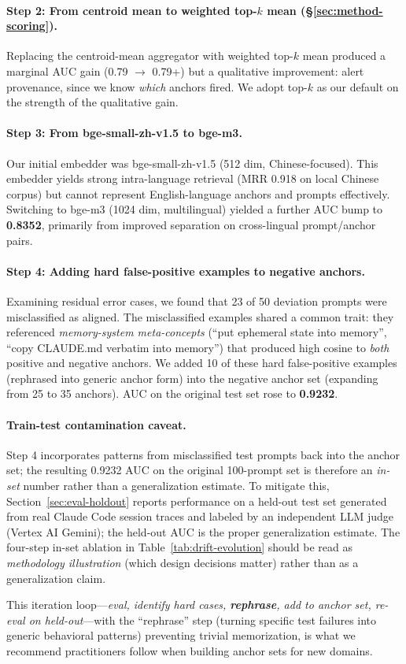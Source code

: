 \paragraph{Step 2: From centroid mean to weighted top-$k$ mean
(\S\ref{sec:method-scoring}).}
Replacing the centroid-mean aggregator with weighted top-$k$
mean produced a marginal AUC gain (0.79 $\to$ 0.79+) but a
qualitative improvement: alert provenance, since we know
\emph{which} anchors fired. We adopt top-$k$ as our default
on the strength of the qualitative gain.

\paragraph{Step 3: From bge-small-zh-v1.5 to bge-m3.}
Our initial embedder was bge-small-zh-v1.5 (512 dim,
Chinese-focused). This embedder yields strong intra-language
retrieval (MRR 0.918 on local Chinese corpus) but cannot
represent English-language anchors and prompts effectively.
Switching to bge-m3 (1024 dim, multilingual) yielded a further
AUC bump to \textbf{0.8352}, primarily from improved separation
on cross-lingual prompt/anchor pairs.

\paragraph{Step 4: Adding hard false-positive examples to negative anchors.}
Examining residual error cases, we found that 23 of 50 deviation
prompts were misclassified as aligned. The misclassified examples
shared a common trait: they referenced \emph{memory-system
meta-concepts} (``put ephemeral state into memory'', ``copy
CLAUDE.md verbatim into memory'') that produced high cosine to
\emph{both} positive and negative anchors. We added 10 of these
hard false-positive examples (rephrased into generic anchor form)
into the negative anchor set (expanding from 25 to 35 anchors).
AUC on the original test set rose to \textbf{0.9232}.

\paragraph{Train-test contamination caveat.}
Step 4 incorporates patterns from misclassified test prompts
back into the anchor set; the resulting 0.9232 AUC on the original
100-prompt set is therefore an \emph{in-set} number rather than
a generalization estimate. To mitigate this,
Section~\ref{sec:eval-holdout} reports performance on a held-out
test set generated from real Claude Code session traces and
labeled by an independent LLM judge (Vertex AI Gemini); the
held-out AUC is the proper generalization estimate. The four-step
in-set ablation in Table~\ref{tab:drift-evolution} should be read
as \emph{methodology illustration} (which design decisions matter)
rather than as a generalization claim.

This iteration loop---\emph{eval, identify hard cases,
\textbf{rephrase}, add to anchor set, re-eval on held-out}---with
the ``rephrase'' step (turning specific test failures into generic
behavioral patterns) preventing trivial memorization, is what we
recommend practitioners follow when building anchor sets for new
domains.
